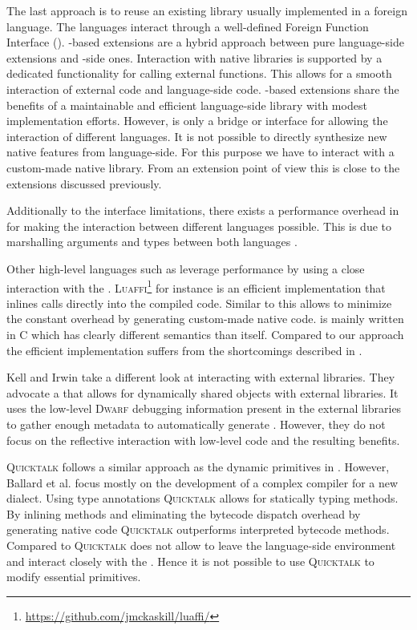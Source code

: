 The last approach is to reuse an existing library usually implemented in a foreign language.
The languages interact through a well-defined Foreign Function Interface (\FFI).
\FFI-based extensions are a hybrid approach between pure language-side extensions and \VM-side ones.
Interaction with native libraries is supported by a dedicated \VM functionality for calling external functions.
This allows for a smooth interaction of external code and language-side code.
\FFI-based extensions share the benefits of a maintainable and efficient lan\-guage-side library with modest implementation efforts.
However, \FFI is only a bridge or interface for allowing the interaction of different languages. 
It is not possible to directly synthesize new native features from language-side.
For this purpose we have to interact with a custom-made native library.
From an extension point of view this is close to the \VM extensions discussed previously.

Additionally to the interface limitations, there exists a performance overhead in \FFI for making the interaction between different languages possible. 
This is due to marshalling arguments and types between both languages \cite{Fish00a,Repp06b}.


Other high-level languages such as \Lua leverage \FFI performance by using a close interaction with the \JIT.
\textsc{Luaffi}\footnote{\url{https://github.com/jmckaskill/luaffi/}} for instance is an efficient \Lua implementation that inlines \FFI calls directly into the \JIT compiled code.
Similar to \B this allows to minimize the constant overhead by generating custom-made native code.
\Luajit is mainly written in C which has clearly different semantics than \Lua itself.
Compared to our approach the efficient \VM implementation suffers from the shortcomings described in . 

Kell and Irwin \cite{Kell11a} take a different look at interacting with external libraries.
They advocate a \Python \VM that allows for dynamically shared objects with external libraries.
It uses the low-level \textsc{Dwarf} debugging information present in the external libraries to gather enough metadata to automatically generate \FFIs.
However, they do not focus on the reflective interaction with low-level code and the resulting benefits. 

\textsc{Quicktalk} \cite{Ball86a} follows a similar approach as the dynamic primitives in \WF.
However, Ballard et al. focus mostly on the development of a complex compiler for a new \ST dialect.
Using type annotations \textsc{Quicktalk} allows for statically typing methods.
By inlining methods and eliminating the bytecode dispatch overhead by generating native code \textsc{Quicktalk} outperforms interpreted bytecode methods.
Compared to \WF \textsc{Quicktalk} does not allow to leave the language-side environment and interact closely with the \VM.
Hence it is not possible to use \textsc{Quicktalk} to modify essential primitives.

